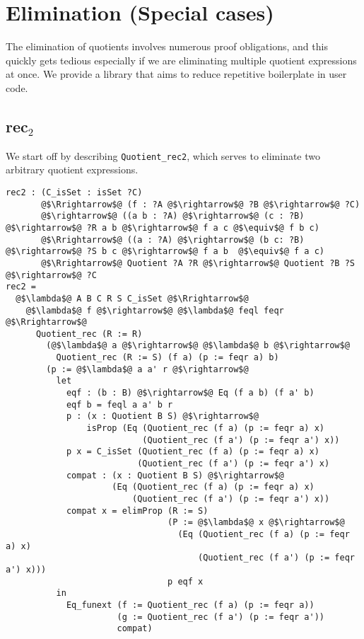 \documentclass[12pt,twoside,maitrise]{dms}
\theoremstyle{definition}
\numberwithin{equation}{section}
\numberwithin{table}{chapter}
\numberwithin{figure}{chapter}
\newcommand\id[1] {\texttt{#1}}
\begin{document}
\section{Elimination (Special cases)}

The elimination of quotients involves numerous proof obligations, and this
quickly gets tedious especially if we are eliminating multiple quotient
expressions at once. We provide a library that aims to reduce repetitive
boilerplate in user code.

\subsection*{rec$_2$}\label{sec:rec2}
We start off by describing \id{Quotient\_rec2}, which serves to eliminate two arbitrary quotient expressions.

\begin{verbatim}
rec2 : (C_isSet : isSet ?C)
       @$\Rrightarrow$@ (f : ?A @$\rightarrow$@ ?B @$\rightarrow$@ ?C)
       @$\rightarrow$@ ((a b : ?A) @$\rightarrow$@ (c : ?B) @$\rightarrow$@ ?R a b @$\rightarrow$@ f a c @$\equiv$@ f b c)
       @$\Rrightarrow$@ ((a : ?A) @$\rightarrow$@ (b c: ?B) @$\rightarrow$@ ?S b c @$\rightarrow$@ f a b  @$\equiv$@ f a c)
       @$\Rrightarrow$@ Quotient ?A ?R @$\rightarrow$@ Quotient ?B ?S @$\rightarrow$@ ?C
rec2 =
  @$\lambda$@ A B C R S C_isSet @$\Rrightarrow$@
    @$\lambda$@ f @$\rightarrow$@ @$\lambda$@ feql feqr @$\Rrightarrow$@
      Quotient_rec (R := R)
        (@$\lambda$@ a @$\rightarrow$@ @$\lambda$@ b @$\rightarrow$@
          Quotient_rec (R := S) (f a) (p := feqr a) b)
        (p := @$\lambda$@ a a' r @$\rightarrow$@
          let
            eqf : (b : B) @$\rightarrow$@ Eq (f a b) (f a' b)
            eqf b = feql a a' b r
            p : (x : Quotient B S) @$\rightarrow$@
                isProp (Eq (Quotient_rec (f a) (p := feqr a) x)
                           (Quotient_rec (f a') (p := feqr a') x))
            p x = C_isSet (Quotient_rec (f a) (p := feqr a) x)
                          (Quotient_rec (f a') (p := feqr a') x)
            compat : (x : Quotient B S) @$\rightarrow$@
                     (Eq (Quotient_rec (f a) (p := feqr a) x)
                         (Quotient_rec (f a') (p := feqr a') x))
            compat x = elimProp (R := S)
                                (P := @$\lambda$@ x @$\rightarrow$@
                                  (Eq (Quotient_rec (f a) (p := feqr a) x)
                                      (Quotient_rec (f a') (p := feqr a') x)))
                                p eqf x
          in
            Eq_funext (f := Quotient_rec (f a) (p := feqr a))
                      (g := Quotient_rec (f a') (p := feqr a'))
                      compat)
\end{verbatim}
\end{document}
